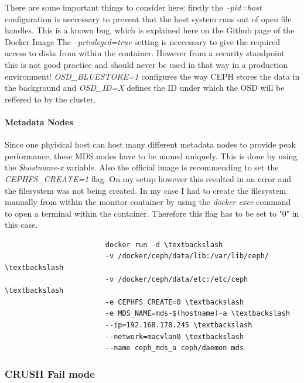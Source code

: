 \documentclass[titlepage, a4paper, 11pt]{scrartcl}
\begin{document}
                    There are some important things to consider here: firstly the \textit{--pid=host} configuration is neccessary to prevent that the host system
                    runs out of open file handles. This is a known bug, which is explained here on the Github page of the Docker Image %
                    The \textit{--privileged=true} setting is neccessary to give the required access to disks from within the container. However from a security standpoint this is not good practice and should never be used in that way in a production environment! \textit{OSD\_BLUESTORE=1} configures the way CEPH stores the data in the background and \textit{OSD\_ID=X} defines the ID under which the OSD will be reffered to by the cluster.

                \paragraph{Metadata Nodes}

                    Since one phyisical host can host many different metadata nodes to provide peak performance, these MDS nodes have to be named uniquely. This is done 
                    by using the \textit{\$hostname-x} variable. Also the official image is recommending to set the \textit{CEPHFS\_CREATE=1} flag. On my setup however this resulted in an error and the filesystem was not being created. In my case I had to create the filesystem manually from within the monitor container by using the \textit{docker exec} command to open a terminal within the container. Therefore this flag has to be set to "0" in this case.

                    \begin{lstlisting}
                        docker run -d \textbackslash
                        -v /docker/ceph/data/lib:/var/lib/ceph/ \textbackslash
                        -v /docker/ceph/data/etc:/etc/ceph \textbackslash
                        -e CEPHFS_CREATE=0 \textbackslash
                        -e MDS_NAME=mds-$(hostname)-a \textbackslash
                        --ip=192.168.178.245 \textbackslash
                        --network=macvlan0 \textbackslash
                        --name ceph_mds_a ceph/daemon mds
                    \end{lstlisting}   
                    
            \subsubsection{CRUSH Fail mode}\label{system:crush-fail}
\end{document}
